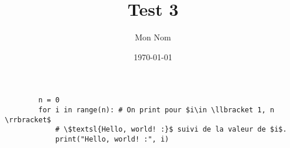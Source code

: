 \documentclass{scrartcl}
\title{Test 3}
\author{Mon Nom}
\date{\today}
\begin{document}
    \begin{verbatim}
        n = 0
        for i in range(n): # On print pour $i\in \llbracket 1, n \rrbracket$ 
            # \$textsl{Hello, world! :}$ suivi de la valeur de $i$.
            print("Hello, world! :", i)
    \end{verbatim}
\end{document}
